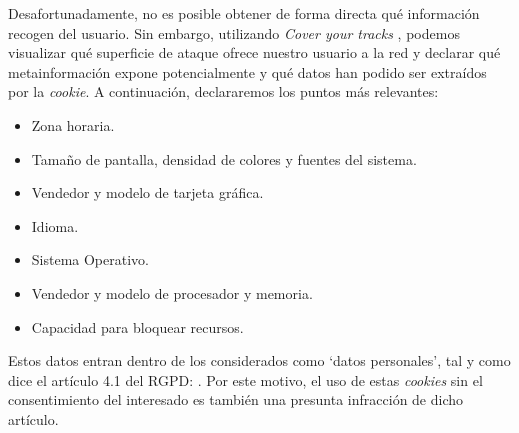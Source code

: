 Desafortunadamente, no es posible obtener de forma directa qué información recogen del usuario. Sin embargo, utilizando \textit{Cover your tracks} \cite{coveryourtracks}, podemos visualizar qué superficie de ataque ofrece nuestro usuario a la red y declarar qué metainformación expone potencialmente y qué datos han podido ser extraídos por la \textit{cookie}. A continuación, declararemos los puntos más relevantes:
\begin{itemize}
    \item Zona horaria.
    \item Tamaño de pantalla, densidad de colores y fuentes del sistema.
    \item Vendedor y modelo de tarjeta gráfica.
    \item Idioma.
    \item Sistema Operativo.
    \item Vendedor y modelo de procesador y memoria.
    \item Capacidad para bloquear recursos.
\end{itemize}

Estos datos entran dentro de los considerados como `datos personales', tal y como dice el artículo 4.1 del RGPD: . Por este motivo, el uso de estas \textit{cookies} sin el consentimiento del interesado es también una presunta infracción de dicho artículo.